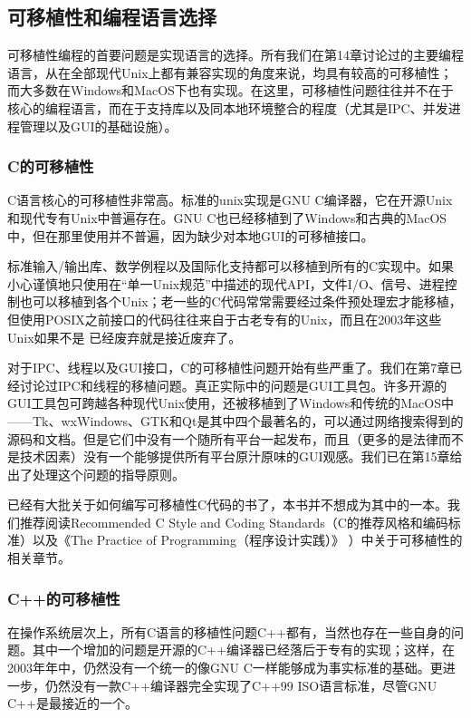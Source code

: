 \documentclass[12pt,oneside]{book}
\begin{document}
\subsection{可移植性和编程语言选择}
可移植性编程的首要问题是实现语言的选择。所有我们在第14章讨论过的主要编程语言，从在全部现代Unix上都有兼容实现的角度来说，均具有较高的可移植性；而大多数在Windows和MacOS下也有实现。在这里，可移植性问题往往并不在于核心的编程语言，而在于支持库以及同本地环境整合的程度（尤其是IPC、并发进程管理以及GUI的基础设施）。

\subsubsection{C的可移植性}
C语言核心的可移植性非常高。标准的unix实现是GNU C编译器，它在开源Unix和现代专有Unix中普遍存在。GNU C也已经移植到了Windows和古典的MacOS中，但在那里使用并不普遍，因为缺少对本地GUI的可移植接口。

标准输入/输出库、数学例程以及国际化支持都可以移植到所有的C实现中。如果小心谨慎地只使用在“单一Unix规范”中描述的现代API，文件I/O、信号、进程控制也可以移植到各个Unix；老一些的C代码常常需要经过条件预处理宏才能移植，但使用POSIX之前接口的代码往往来自于古老专有的Unix，而且在2003年这些Unix如果不是
已经废弃就是接近废弃了。

对于IPC、线程以及GUI接口，C的可移植性问题开始有些严重了。我们在第7章已经讨论过IPC和线程的移植问题。真正实际中的问题是GUI工具包。许多开源的GUI工具包可跨越各种现代Unix使用，还被移植到了Windows和传统的MacOS中——Tk、wxWindows、GTK和Qt是其中四个最著名的，可以通过网络搜索得到的源码和文档。但是它们中没有一个随所有平台一起发布，而且（更多的是法律而不是技术因素）没有一个能够提供所有平台原汁原味的GUI观感。我们已在第15章给出了处理这个问题的指导原则。

已经有大批关于如何编写可移植性C代码的书了，本书并不想成为其中的一本。我们推荐阅读Recommended C Style and Coding Standards（C的推荐风格和编码标准）\cite{Cannon}以及《The Practice of Programming（程序设计实践）》 \cite{Kernighan-Pike99}）中关于可移植性的相关章节。

\subsubsection{C++的可移植性}
在操作系统层次上，所有C语言的移植性问题C++都有，当然也存在一些自身的问题。其中一个增加的问题是开源的C++编译器已经落后于专有的实现；这样，在2003年年中，仍然没有一个统一的像GNU C一样能够成为事实标准的基础。更进一步，仍然没有一款C++编译器完全实现了C++99 ISO语言标准，尽管GNU C++是最接近的一个。
\end{document}
